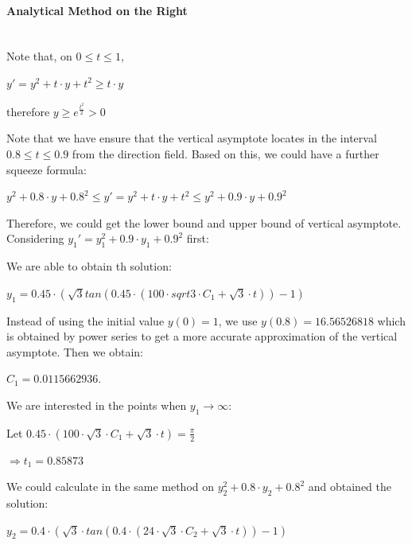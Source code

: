 \documentclass[11pt,a4paper]{article}
\begin{document}
\begin{multicols}{2}
	\small
	\paragraph{\small Analytical Method on the Right}
	
	~\\
	
	\noindent Note that, on $0\leq t \leq 1$,

	\begin{center}
		$y'=y^2+t \cdot y+t^2 \geq t \cdot y$

		therefore $y \geq e^{\frac{t^2}{2}}>0$
	\end{center}

	\noindent Note that we have ensure that the vertical asymptote locates in the interval $0.8\leq t \leq 0.9$ from the direction field. Based on this, we could have a further squeeze formula: 
	\begin{center}
		$y^2+0.8 \cdot y+0.8^2 \leq y' = y^2+t \cdot y+t^2 \leq y^2+0.9 \cdot y+0.9^2$
	\end{center}
	\noindent Therefore, we could get the lower bound and upper bound of vertical asymptote. Considering $y_1'=y_1^2+0.9 \cdot y_1+0.9^2$ first:

	\noindent We are able to obtain th solution:
	\begin{center}
		$y_1=0.45 \cdot (\sqrt3tan(0.45 \cdot (100 \cdot sqrt3 \cdot C_1+\sqrt{3} \cdot t))-1)$
	\end{center}
	\noindent Instead of using the initial value $y(0)=1$, we use $y(0.8)=16.56526818$ which is obtained by power series to get a more accurate approximation of the vertical asymptote. Then we obtain: 
	\begin{center}
		$C_1=0.0115662936$.
	\end{center}
	\noindent We are interested in the points when $y_1 \rightarrow \infty$:
	\begin{center}
		Let $0.45 \cdot (100 \cdot \sqrt3 \cdot C_1+\sqrt3 \cdot t)=\frac{\pi}{2}$ 
		
		$\Rightarrow t_1 = 0.85873$
	\end{center}

	\noindent We could calculate in the same method on $y_2^2+0.8 \cdot y_2+0.8^2$ and obtained the solution:

	\begin{center}
		$y_2=0.4 \cdot (\sqrt{3} \cdot tan(0.4 \cdot (24 \cdot \sqrt{3} \cdot C_2+\sqrt{3} \cdot t))-1)$
	\end{center}


\end{multicols}
\end{document}
